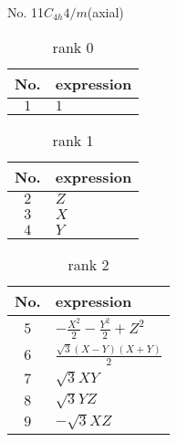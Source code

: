 \documentclass[fleqn,8pt,landscape]{jsarticle}
\begin{document}
\setcounter{MaxMatrixCols}{16}

\begin{center}
\LARGE
No. 11\quad$C_{4h}$\quad$4/m$\quad[ tetragonal ] (axial)
\end{center}
\begin{table}[ht!]
\begin{center}
\caption{rank 0}
\renewcommand{\arraystretch}{1.3}
\begin{tabular}{cl} \hline \hline
No. & expression \\ \hline
$ 1 $ & $ 1 $ \\
 \hline \hline
\end{tabular}
\end{center}
\end{table}
\begin{table}[ht!]
\begin{center}
\caption{rank 1}
\renewcommand{\arraystretch}{1.3}
\begin{tabular}{cl} \hline \hline
No. & expression \\ \hline
$ 2 $ & $ Z $ \\
$ 3 $ & $ X $ \\
$ 4 $ & $ Y $ \\
 \hline \hline
\end{tabular}
\end{center}
\end{table}
\begin{table}[ht!]
\begin{center}
\caption{rank 2}
\renewcommand{\arraystretch}{1.3}
\begin{tabular}{cl} \hline \hline
No. & expression \\ \hline
$ 5 $ & $ - \frac{X^{2}}{2} - \frac{Y^{2}}{2} + Z^{2} $ \\
$ 6 $ & $ \frac{\sqrt{3} \left(X - Y\right) \left(X + Y\right)}{2} $ \\
$ 7 $ & $ \sqrt{3} X Y $ \\
$ 8 $ & $ \sqrt{3} Y Z $ \\
$ 9 $ & $ - \sqrt{3} X Z $ \\
 \hline \hline
\end{tabular}
\end{center}
\end{table}
\end{document}
